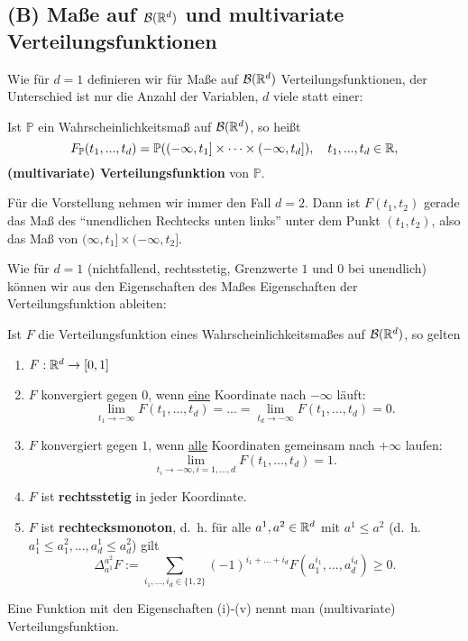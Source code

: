 \subsection*{(B) Maße auf $\mathcal B(\mathbb{R}^d)$ und multivariate Verteilungsfunktionen}
Wie f\"ur $d=1$ definieren wir f\"ur Ma\ss e auf $\mathcal B(\mathbb{R}^d)$ Verteilungsfunktionen, der Unterschied ist nur die Anzahl der Variablen, $d$ viele statt einer:
\begin{deff}
	Ist $\mathbb{P}$ ein Wahrscheinlichkeitsmaß auf $ \mathcal{B}(\mathbb{R}^d) $, so heißt $$F_{\mathbb{P}}(t_1,...,t_d) = \mathbb{P}((-\infty, t_1] \times \dots \times (-\infty, t_d]),\quad t_1,...,t_d\in\mathbb{R},$$ \textbf{(multivariate) Verteilungsfunktion} von $\mathbb{P}$.
\end{deff}
F\"ur die Vorstellung nehmen wir immer den Fall $d=2$. Dann ist $F(t_1,t_2)$ gerade das Ma\ss{} des \enquote{unendlichen Rechtecks unten links} unter dem Punkt $(t_1,t_2)$, also das Ma\ss{} von $(\infty, t_1]\times (-\infty,t_2].$\smallskip

Wie f\"ur $d=1$ (nichtfallend, rechtsstetig, Grenzwerte $1$ und $0$ bei unendlich) k\"onnen wir aus den Eigenschaften des Ma\ss es Eigenschaften der Verteilungsfunktion ableiten:
\begin{prop}\label{p9}
	Ist $F$ die Verteilungsfunktion eines Wahrscheinlichkeitsmaßes auf $\mathcal{B}(\mathbb{R}^d)$, so gelten
	\begin{enumerate}[label=(\roman*)]
	\item $F:\mathbb{R}^d\to [0,1]$
	\item $F$ konvergiert gegen $0$, wenn \underline{eine} Koordinate nach $-\infty$ l\"auft:
	\[ \lim\limits_{t_1 \to -\infty} F(t_1,...,t_d) = ... = \lim\limits_{t_d \to -\infty} F(t_1,...,t_d) = 0. \]
	\item $F$ konvergiert gegen $1$, wenn \underline{alle} Koordinaten gemeinsam nach $+\infty$ laufen: 
	 \[ \lim\limits_{t_i \to -\infty, i=1,...,d} F(t_1,...,t_d) = 1. \]
	\item $F$ ist \textbf{rechtsstetig} in jeder Koordinate.
	\item $F$ ist \textbf{rechtecksmonoton}, \mbox{d. h.} für alle $a^1, a^2\in \mathbb{R}^d$ mit $a^1 \leq a^2$ (\mbox{d. h.} $a_1^1 \leq a_1^2,..., a_d^1 \leq a_d^2$) gilt \[ \Delta_{a^1}^{a^2}F := \sum\limits_{i_1,...,i_d \in \{ 1,2 \}} (-1)^{i_1+...+i_d} F(a_1^{i_1},...,a_d^{i_d}) \geq 0. \]
	\end{enumerate}
	Eine Funktion mit den Eigenschaften (i)-(v) nennt man (multivariate) Verteilungsfunktion.
\end{prop}

